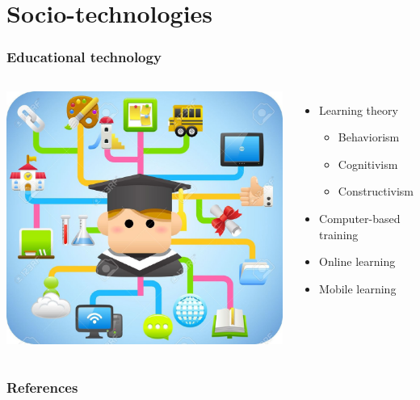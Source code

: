 \documentclass{beamer}
\begin{document}
\section{Socio-technologies}
\begin{frame}
	\frametitle{Educational technology}
	\begin{columns}
		\includegraphics[scale=.5]{EdTech_main}
		\begin{itemize}
			\item Learning theory
				\begin{itemize}
					\item Behaviorism
					\item Cognitivism
					\item Constructivism
				\end{itemize}
			\item Computer-based training
			\item Online learning
			\item Mobile learning
		\end{itemize}
	\end{columns}
\end{frame}

\begin{frame}
	\frametitle{References}
	\nocite{*}
	
	
\end{frame}
\end{document}
